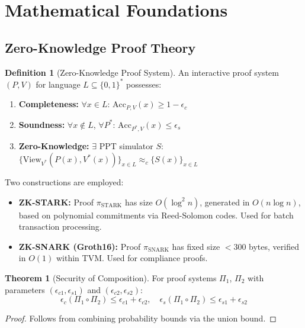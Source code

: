 \documentclass[12pt,a4paper]{article}
\theoremstyle{definition}
\newtheorem{definition}{Definition}[section]
\newtheorem{theorem}{Theorem}[section]
\theoremstyle{remark}
\begin{document}
\section{Mathematical Foundations}
\label{app:math-foundations}

\subsection{Zero-Knowledge Proof Theory}

\begin{definition}[Zero-Knowledge Proof System]
An interactive proof system $(P, V)$ for language $L \subseteq \{0,1\}^*$ possesses:
\begin{enumerate}[nosep]
    \item \textbf{Completeness:} $\forall x \in L$: $\text{Acc}_{P,V}(x) \geq 1 - \epsilon_c$
    \item \textbf{Soundness:} $\forall x \notin L$, $\forall P^*$: $\text{Acc}_{P^*,V}(x) \leq \epsilon_s$
    \item \textbf{Zero-Knowledge:} $\exists$ PPT simulator $S$: $\{\text{View}_{V^*}(P(x), V^*(x))\}_{x \in L} \approx_c \{S(x)\}_{x \in L}$
\end{enumerate}
\end{definition}

Two constructions are employed:
\begin{itemize}[nosep]
    \item \textbf{ZK-STARK:} Proof $\pi_{\text{STARK}}$ has size $O(\log^2 n)$, generated in $O(n \log n)$, based on polynomial commitments via Reed-Solomon codes. Used for batch transaction processing.
    \item \textbf{ZK-SNARK (Groth16):} Proof $\pi_{\text{SNARK}}$ has fixed size $< 300$ bytes, verified in $O(1)$ within TVM. Used for compliance proofs.
\end{itemize}

\begin{theorem}[Security of Composition]
\label{thm:proof-composition}
For proof systems $\Pi_1$, $\Pi_2$ with parameters $(\epsilon_{c1}, \epsilon_{s1})$ and $(\epsilon_{c2}, \epsilon_{s2})$:
\begin{equation}
\epsilon_c(\Pi_1 \circ \Pi_2) \leq \epsilon_{c1} + \epsilon_{c2}, \quad \epsilon_s(\Pi_1 \circ \Pi_2) \leq \epsilon_{s1} + \epsilon_{s2}
\end{equation}
\end{theorem}

\begin{proof}
Follows from combining probability bounds via the union bound.
\end{proof}
\end{document}
